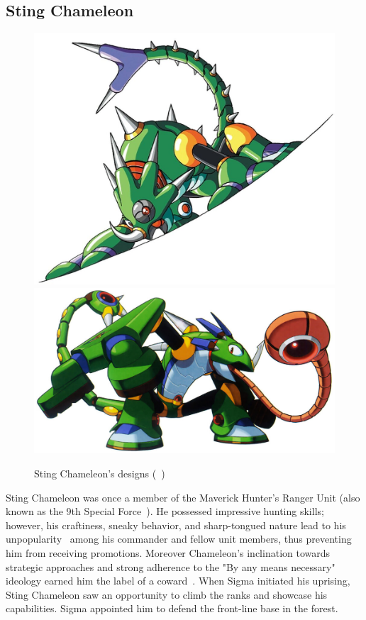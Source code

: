 \subsection{Sting Chameleon}\label{boss:Sting_chameleon}
\begin{figure}[htp]
	\centering
	\includegraphics[width=.49\linewidth]{figures/X1/Sting_chameleon/Stingchameleon.jpg}
	\includegraphics[width=.49\linewidth]{figures/X1/Sting_chameleon/MHXStingChameleon.jpg}
	\caption{Sting Chameleon's designs (~\cite{book:MMX_Complete_art})}
\end{figure}

Sting Chameleon was once a member of the Maverick Hunter's Ranger Unit (also known as the 9th Special Force~\cite{wayback:X_resources}). He possessed impressive hunting skills; however, his craftiness, sneaky behavior, and sharp-tongued nature lead to his unpopularity~\cite{Xcoll1:Manual_X1} among his commander and fellow unit members, thus preventing him from receiving promotions. Moreover Chameleon's inclination towards strategic approaches and strong adherence to the "By any means necessary" ideology earned him the label of a coward~\cite{MHX:manual}. When Sigma initiated his uprising, Sting Chameleon saw an opportunity to climb the ranks and showcase his capabilities. Sigma appointed him to defend the front-line base in the forest.

